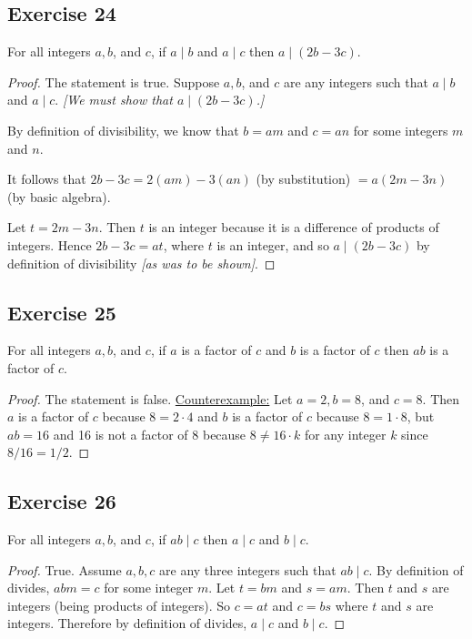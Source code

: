 \documentclass[14pt]{extarticle}
\begin{document}
\subsection{Exercise 24}
For all integers $a, b$, and $c$, if $a \mid b$ and $a \mid c$ then $a \mid (2b - 3c)$.

\begin{proof}
    The statement is true. Suppose $a, b$, and $c$ are any integers such that $a\mid b$ and $a\mid c$. {\it [We must show that $a\mid (2b - 3c)$.]}

    By definition of divisibility, we know that $b = am$ and $c = an$ for some integers $m$ and $n$.

    It follows that $2b - 3c = 2(am) - 3(an)$ (by substitution) $= a(2m - 3n)$ (by basic algebra).

    Let $t = 2m - 3n$. Then $t$ is an integer because it is a difference of products of integers. Hence $2b - 3c = at$, where $t$ is an integer, and so $a\mid (2b - 3c)$ by definition of divisibility {\it [as was to be shown]}.
\end{proof}

\subsection{Exercise 25}
For all integers $a, b$, and $c$, if $a$ is a factor of $c$ and $b$ is a factor of $c$ then $ab$ is a factor of $c$.

\begin{proof}
    The statement is false. \underline{Counterexample:} Let
    $a = 2, b = 8$, and $c = 8$. Then $a$ is a factor of $c$ because $8 = 2\cdot 4$ and $b$ is a factor of $c$ because $8 = 1\cdot8$, but $ab = 16$ and 16 is not a factor of 8 because $8 \neq 16\cdot k$ for any integer $k$ since $8/16 = 1/2$.
\end{proof}

\subsection{Exercise 26}
For all integers $a, b$, and $c$, if $ab \mid c$ then $a \mid c$ and $b \mid c$.

\begin{proof}
    True. Assume $a,b,c$ are any three integers such that $ab \mid c$. By definition of divides, $abm = c$ for some integer $m$. Let $t = bm$ and $s = am$. Then $t$ and $s$ are integers (being products of integers). So $c = at$ and $c = bs$ where $t$ and $s$ are integers. Therefore by definition of divides, $a \mid c$ and $b \mid c$.
\end{proof}
\end{document}
